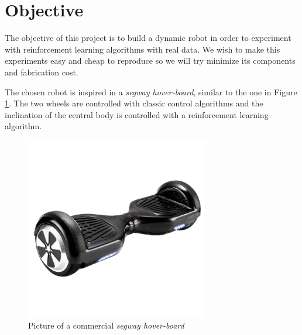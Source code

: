 \section{Objective}
The objective of this project is to build a dynamic robot in order to experiment with reinforcement learning algorithms with real data. We wish to make this experiments easy and cheap to reproduce so we will try minimize its components and fabrication cost. 

The chosen robot is inspired in a \textit{segway hover-board}, similar to the one in Figure \ref{fig:Picture of a commercial segway hover-board}. The two wheels are controlled with classic control algorithms and the inclination of the central body is controlled with a reinforcement learning algorithm.

\begin{figure}
	\centering
	\includegraphics[width=8cm]{img/segway_hoverboard_picture.png}
	\caption{Picture of a commercial \textit{segway hover-board} }
	\label{fig:Picture of a commercial segway hover-board}
\end{figure}